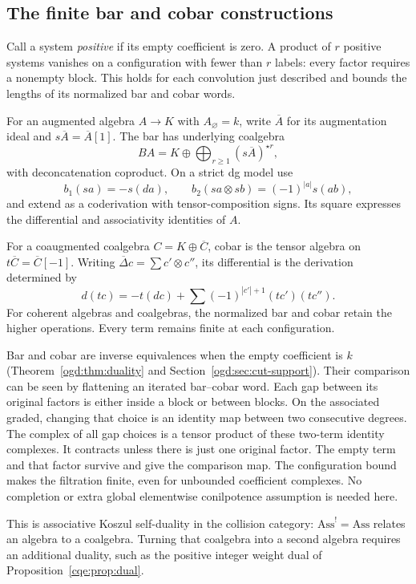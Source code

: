 \subsection{The finite bar and cobar constructions}

Call a system \emph{positive} if its empty coefficient is
zero. A product of \(r\) positive systems vanishes on a
configuration with fewer than \(r\) labels: every factor
requires a nonempty block. This holds for each convolution
just described and bounds the lengths of its normalized bar
and cobar words.

For\label{e1f:def:bar-augmentation-suspension} an augmented algebra \(A\to K\) with \(A_\varnothing=k\),
write \(\overline A\) for its augmentation ideal and
\(s\overline A=\overline A[1]\). The bar has underlying
coalgebra
\[
 BA=K\oplus\bigoplus_{r\geq1}(s\overline A)^{\star r},
\]
with deconcatenation coproduct. On a strict dg model use
\[
 b_1(sa)=-s(da),\qquad
 b_2(sa\otimes sb)=(-1)^{|a|}s(ab),
\]
and extend as a coderivation with tensor-composition signs.
Its square expresses the differential and associativity
identities of \(A\).

For a coaugmented coalgebra \(C=K\oplus\overline C\),
cobar is the tensor algebra on \(t\overline C=\overline C[-1]\).
Writing \(\overline\Delta c=\sum c'\otimes c''\), its
differential is the derivation determined by
\[
 d(tc)=-t(dc)+\sum(-1)^{|c'|+1}(tc')(tc'').
\]
For coherent algebras and coalgebras, the normalized bar and
cobar retain the higher operations. Every term remains finite
at each configuration.

Bar and cobar are inverse equivalences when the empty
coefficient is \(k\)
(Theorem~\ref{ogd:thm:duality} and
Section~\ref{ogd:sec:cut-support}). Their comparison can be
seen by flattening an iterated bar--cobar word. Each gap
between its original factors is either inside a block or
between blocks. On the associated graded, changing that
choice is an identity map between two consecutive degrees.
The complex of all gap choices is a tensor product of these
two-term identity complexes. It contracts unless there is
just one original factor. The empty term and that factor
survive and give the comparison map. The configuration bound
makes the filtration finite, even for unbounded coefficient
complexes. No completion or extra global elementwise
conilpotence assumption is needed here.

This is associative Koszul self-duality in the collision
category: \(\mathrm{Ass}^!=\mathrm{Ass}\) relates an algebra
to a coalgebra. Turning that coalgebra into a second algebra
requires an additional duality, such as the positive integer
weight dual of Proposition~\ref{cqe:prop:dual}.

